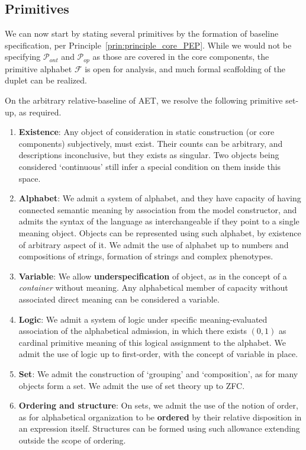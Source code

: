 \subsection{Primitives}

We can now start by stating several primitives by the formation of baseline specification, per Principle~\ref{prin:principle_core_PEP}. While we would not be specifying $\mathcal{P}_{ont}$ and $\mathcal{P}_{op}$ as those are covered in the core components, the primitive alphabet $\mathcal{F}$ is open for analysis, and much formal scaffolding of the duplet can be realized. 

\begin{lemma}
	On the arbitrary relative-baseline of AET, we resolve the following primitive set-up, as required. 
	\begin{enumerate}[itemsep=1pt,topsep=1pt]
		\item \textbf{Existence}: Any object of consideration in static construction (or core components) subjectively, must exist. Their counts can be arbitrary, and descriptions inconclusive, but they exists as singular. Two objects being considered `continuous' still infer a special condition on them inside this space. 
		\item \textbf{Alphabet}: We admit a system of alphabet, and they have capacity of having connected semantic meaning by association from the model constructor, and admits the syntax of the language as interchangeable if they point to a single meaning object. Objects can be represented using such alphabet, by existence of arbitrary aspect of it. We admit the use of alphabet up to numbers and compositions of strings, formation of strings and complex phenotypes. 
		\item \textbf{Variable}: We allow \textbf{underspecification} of object, as in the concept of a \textit{container} without meaning. Any alphabetical member of capacity without associated direct meaning can be considered a variable. 
		\item \textbf{Logic}: We admit a system of logic under specific meaning-evaluated association of the alphabetical admission, in which there exists $(0,1)$ as cardinal primitive meaning of this logical assignment to the alphabet. We admit the use of logic up to first-order, with the concept of variable in place. 
		\item \textbf{Set}: We admit the construction of `grouping' and `composition', as for many objects form a set. We admit the use of set theory up to ZFC. 
		\item \textbf{Ordering and structure}: On sets, we admit the use of the notion of order, as for alphabetical organization to be \textbf{ordered} by their relative disposition in an expression itself. Structures can be formed using such allowance extending outside the scope of ordering. 
	\end{enumerate}
\end{lemma}

